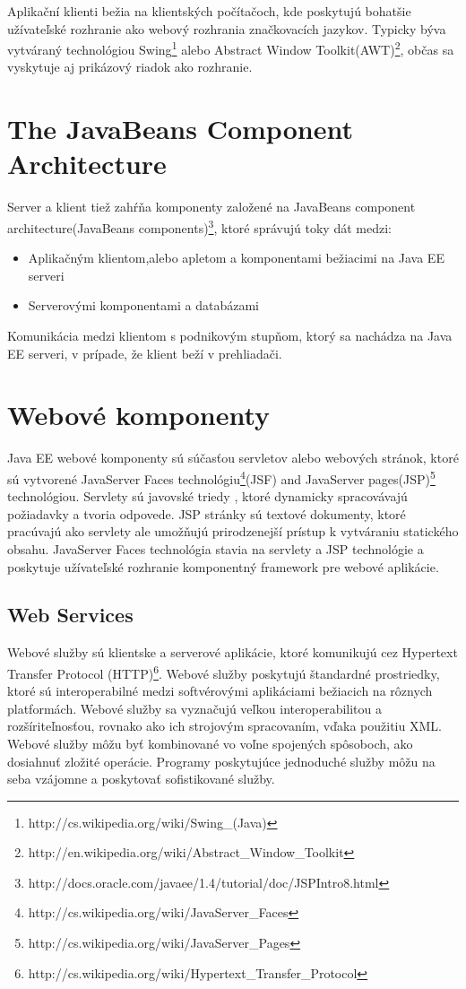 Aplikační klienti bežia na klientských počítačoch, kde poskytujú bohatšie užívateľské rozhranie ako webový rozhrania značkovacích jazykov.
Typicky býva vytváraný technológiou Swing\footnote{http://cs.wikipedia.org/wiki/Swing\_(Java)} alebo Abstract Window Toolkit(AWT)\footnote{http://en.wikipedia.org/wiki/Abstract\_Window\_Toolkit}, občas sa vyskytuje aj prikázový riadok ako rozhranie.

\section{The JavaBeans Component Architecture}
Server a klient tiež zahŕňa komponenty založené na JavaBeans component architecture(JavaBeans components)\footnote{http://docs.oracle.com/javaee/1.4/tutorial/doc/JSPIntro8.html}, ktoré správujú toky dát medzi:
\begin{itemize}
\item Aplikačným klientom,alebo apletom a komponentami bežiacimi na Java EE serveri
\item Serverovými komponentami a databázami
\end{itemize}


Komunikácia medzi klientom s podnikovým stupňom, ktorý sa nachádza na Java EE serveri, v prípade, že klient beží v prehliadači.

\section{Webové komponenty}
Java EE webové komponenty sú súčasťou servletov alebo webových stránok, ktoré sú vytvorené JavaServer Faces technológiu\footnote{http://cs.wikipedia.org/wiki/JavaServer\_Faces}(JSF) and JavaServer pages(JSP)\footnote{http://cs.wikipedia.org/wiki/JavaServer\_Pages} technológiou.
Servlety sú javovské triedy , ktoré dynamicky spracovávajú požiadavky a tvoria odpovede. JSP stránky sú textové dokumenty, ktoré pracúvajú ako servlety ale umožňujú prirodzenejší prístup k vytváraniu statického obsahu. JavaServer Faces technológia stavia na servlety a JSP technológie a poskytuje užívateľské rozhranie komponentný framework pre webové aplikácie.


\subsection{Web Services}
Webové služby sú klientske a serverové aplikácie, ktoré komunikujú cez Hypertext Transfer Protocol (HTTP)\footnote{http://cs.wikipedia.org/wiki/Hypertext\_Transfer\_Protocol}. Webové služby poskytujú štandardné prostriedky, ktoré sú interoperabilné medzi softvérovými aplikáciami bežiacich na rôznych platformách. Webové služby sa vyznačujú veľkou interoperabilitou a rozšíriteľnosťou, rovnako ako ich strojovým spracovaním, vďaka použitiu XML. Webové služby môžu byť kombinované vo voľne spojených spôsoboch, ako dosiahnuť zložité operácie. Programy poskytujúce jednoduché služby môžu na seba vzájomne a poskytovať sofistikované služby.


